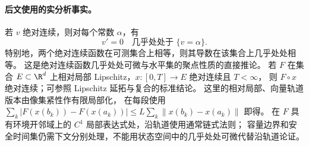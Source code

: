 \paragraph{后文使用的实分析事实。}
若 $v$ 绝对连续，则对每个常数 $\alpha$，有
\begin{equation}
 v'=0\quad\text{几乎处处于 }\{v=\alpha\}.
 \label{eq:ac-level-set}
\end{equation}
特别地，两个绝对连续函数在可测集合上相等，则其导数在该集合上几乎处处相等。
这是绝对连续函数几乎处处可微与水平集的聚点性质的直接推论\citep[\S222K、\S225C(b)]{Fremlin2001Volume2}。
若 $F$ 在集合 $E\subset\R^d$ 上相对局部 Lipschitz，$x:[0,T]\to E$ 绝对连续且 $T<\infty$，
则 $F\circ x$ 绝对连续；可参照 Lipschitz 延拓与复合的标准结论\citep[\S262B(b)、\S262X(l)]{Fremlin2001Volume2}。
这里的相对局部、向量轨道版本由像集紧性作有限局部化，
在每段使用 $\sum_k|F(x(b_k))-F(x(a_k))|\le L\sum_k\|x(b_k)-x(a_k)\|$ 即得。
在 $F$ 具有环境开邻域上的 $C^1$ 局部表达式处，沿轨道使用通常链式法则；
容量边界和安全时间集仍需下文分别处理，不能用状态空间中的几乎处处可微代替沿轨道论证。
